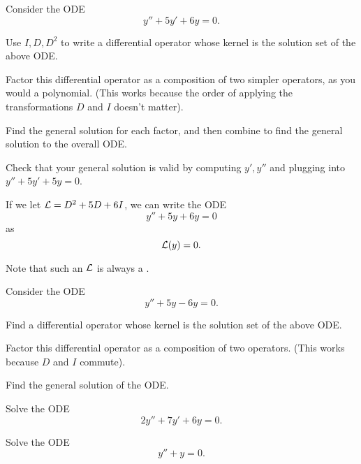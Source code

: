 \begin{applicationActivities}
\begin{activity}{15}
Consider the ODE \[y''+5y'+6y=0.\]
\vfill
\begin{subactivity}
Use \(I,D,D^2\) to write a differential operator whose kernel is the solution set of the above ODE.
\end{subactivity}
\begin{subactivity}
Factor this differential operator as a composition of two simpler operators, as you would a polynomial. 
(This works because the order of applying the transformations \(D\) and \(I\) doesn't matter).
\end{subactivity}
\begin{subactivity}
Find the general solution for each factor, and then combine to find the general solution
to the overall ODE.
\end{subactivity}
\begin{subactivity}
Check that your general solution is valid by computing \(y',y''\) and plugging into
\(y''+5y'+5y=0\).
\end{subactivity}
\end{activity}

\begin{observation}
If we let \(\mathcal{L}=D^2+5D+6I\), we can write the ODE \[y''+5y+6y=0\] as \[\mathcal{L}(y)=0.\]

Note that such an \(\mathcal{L}\) is always a .
\end{observation}

\begin{activity}{10}
Consider the ODE \[y''+5y-6y=0.\]
\vfill
\begin{subactivity}
Find a differential operator whose kernel is the solution set of the above ODE.
\end{subactivity}
\begin{subactivity}
Factor this differential operator as a composition of two operators. (This works because \(D\) and \(I\) commute).
\end{subactivity}
\begin{subactivity}
Find the general solution of the ODE.
\end{subactivity}
\end{activity}

\begin{activity}{10}
Solve the ODE \[ 2y''+7y'+6y=0.\]
\end{activity}

\begin{activity}{15}
Solve the ODE \[ y''+y=0.\]
\end{activity}


\end{applicationActivities}
